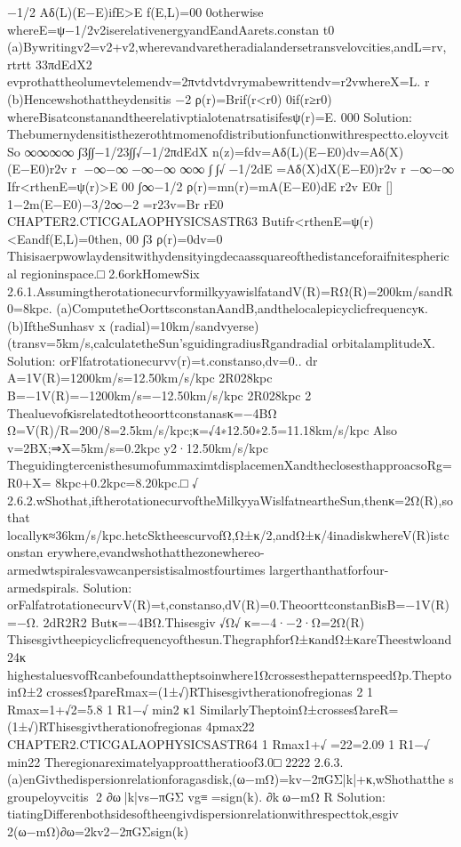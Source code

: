 {−1/2
Aδ(L)(E−E)ifE>E
f(E,L)=00
0otherwise
whereE=ψ−1/2v2iserelativenergyandEandAarets.constan
t0
(a)Bywritingv2=v2+v2,wherevandvaretheradialandersetransvelovcities,andL=rv,
rtrtt
33πdEdX2
evprothattheolumevtelemendv=2πvtdvtdvrymabewrittendv=r2vwhereX=L.
r
(b)Hencewshothattheydensitis
{−2
ρ(r)=Brif(r<r0)
0if(r≥r0)
whereBisatconstanandtheerelativptialotenatrsatisifesψ(r)=E.
000
Solution:
Thebumernydensitisthezerothtmomenofdistributionfunctionwithrespectto.eloyvcitSo
∞∞∞∞
∫3∫∫−1/23∫∫√−1/2πdEdX
n(z)=fdv=Aδ(L)(E−E0)dv=Aδ(X)(E−E0)r2v
r
−∞−∞−∞−∞
∞∞
∫∫√−1/2dE
=Aδ(X)dX(E−E0)r2v
r
−∞−∞
Ifr<rthenE=ψ(r)>E
00
∫∞−1/2
ρ(r)=mn(r)=mA(E−E0)dE
r2v
E0r
[]
1−2m(E−E0)−3/2∞−2
=r23v=Br
rE0
CHAPTER2.CTICGALAOPHYSICSASTR63
Butifr<rthenE=ψ(r)<Eandf(E,L)=0then,
00
∫3
ρ(r)=0dv=0
Thisisaerpwowlaydensitwithydensityingdecaassquareofthedistanceforaifnitespherical
regioninspace.□
2.6orkHomewSix
2.6.1.AssumingtherotationecurvformilkyyawislfatandV(R)=RΩ(R)=200km/sandR0=8kpc.
(a)ComputetheOorttsconstanAandB,andthelocalepicyclicfrequencyκ.(b)IftheSunhasv
x
(radial)=10km/sandvyerse)(transv=5km/s,calculatetheSun’sguidingradiusRgandradial
orbitalamplitudeX.
Solution:
orFlfatrotationecurvv(r)=t.constanso,dv=0..
dr
A=1V(R)=1200km/s=12.50km/s/kpc
2R028kpc
B=−1V(R)=−1200km/s=−12.50km/s/kpc
2R028kpc
2
Thealuevofκisrelatedtotheoorttconstanasκ=−4BΩ
Ω=V(R)/R=200/8=2.5km/s/kpc;κ=√4∗12.50∗2.5=11.18km/s/kpc
Also
v=2BX;⇒X=5km/s=0.2kpc
y2·12.50km/s/kpc
TheguidingtercenisthesumofummaximtdisplacemenXandtheclosesthapproacsoRg=R0+X=
8kpc+0.2kpc=8.20kpc.□
√
2.6.2.wShothat,iftherotationecurvoftheMilkyyaWislfatneartheSun,thenκ=2Ω(R),sothat
locallyκ≈36km/s/kpc.hetcSktheescurvofΩ,Ω±κ/2,andΩ±κ/4inadiskwhereV(R)istconstan
erywhere,evandwshothatthezonewhereo-armedwtspiralesvawcanpersistisalmostfourtimes
largerthanthatforfour-armedspirals.
Solution:
orFalfatrotationecurvV(R)=t,constanso,dV(R)=0.TheoorttconstanBisB=−1V(R)=−Ω.
2dR2R2
Butκ=−4BΩ.Thisesgiv
√Ω√
κ=−4·−2·Ω=2Ω(R)
Thisesgivtheepicyclicfrequencyofthesun.ThegraphforΩ±κandΩ±κareTheestwloand
24κ
highestaluesvofRcanbefoundattheptsoinwhere1ΩcrossesthepatternspeedΩp.TheptoinΩ±2
crossesΩpareRmax=(1±√)RThisesgivtherationofregionas
2
1
Rmax=1+√2=5.8
1
R1−√
min2
κ1
SimilarlyTheptoinΩ±crossesΩareR=(1±√)RThisesgivtherationofregionas
4pmax22
CHAPTER2.CTICGALAOPHYSICSASTR64
1
Rmax1+√
=22=2.09
1
R1−√
min22
Theregionareximatelyapproattheratioof3.0□
2222
2.6.3.(a)enGivthedispersionrelationforagasdisk,(ω−mΩ)=kv−2πGΣ|k|+κ,wShothatthe
s
groupeloyvcitis
2
∂ω|k|vs−πGΣ
vg≡=sign(k).
∂kω−mΩ
R
Solution:
tiatingDifferenbothsidesoftheengivdispersionrelationwithrespecttok,esgiv
2(ω−mΩ)∂ω=2kv2−2πGΣsign(k)
}}

